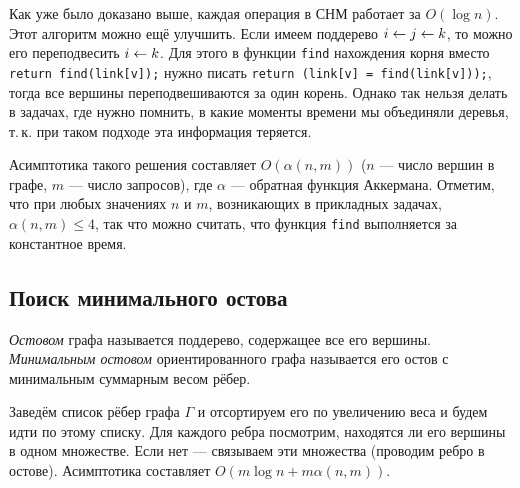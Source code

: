 Как уже было доказано выше, каждая операция в СНМ работает за $O(\log n)$. Этот алгоритм можно ещё улучшить. Если имеем поддерево $i \hm \ot j \ot k$, то можно его переподвесить $i \leftarrow k$. Для этого в функции \texttt{find} нахождения корня вместо \texttt{return find(link[v]);} нужно писать \texttt{return (link[v] = find(link[v]));}, тогда все вершины переподвешиваются за один корень. Однако так нельзя делать в задачах, где нужно помнить, в какие моменты времени мы объединяли деревья, т.\,к. при таком подходе эта информация теряется.

Асимптотика такого решения составляет $O(\alpha(n, m))$ ($n$ --- число вершин в графе, $m$ --- число запросов), где $\alpha$ --- обратная функция Аккермана. Отметим, что при любых значениях $n$ и $m$, возникающих в прикладных задачах, $\alpha(n, m) \leqslant 4$, так что можно считать, что функция \texttt{find} выполняется за константное время.

\subsection{Поиск минимального остова}

\begin{definition}
    \textit{Остовом} графа называется поддерево, содержащее все его вершины. \textit{Минимальным остовом} ориентированного графа называется его остов с минимальным суммарным весом рёбер.
\end{definition}

\begin{algorithm}[Краскала]
    Заведём список рёбер графа $\Gamma$ и отсортируем его по увеличению веса и будем идти по этому списку.  Для каждого ребра посмотрим, находятся ли его вершины в одном множестве. Если нет --- связываем эти множества (проводим ребро в остове). Асимптотика составляет $O(m\log n + m\alpha(n, m))$.
\end{algorithm}
